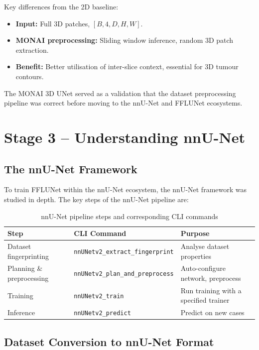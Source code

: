 \documentclass[12pt,a4paper]{report}
\begin{document}
Key differences from the 2D baseline:
\begin{itemize}[leftmargin=*]
    \item \textbf{Input:} Full 3D patches, $[B, 4, D, H, W]$.
    \item \textbf{MONAI preprocessing:} Sliding window inference, random 3D patch extraction.
    \item \textbf{Benefit:} Better utilisation of inter-slice context, essential for 3D tumour contours.
\end{itemize}

The MONAI 3D UNet served as a validation that the dataset preprocessing pipeline was correct before moving to the nnU-Net and FFLUNet ecosystems.

\section{Stage 3 -- Understanding nnU-Net}

\subsection{The nnU-Net Framework}

To train FFLUNet within the nnU-Net ecosystem, the nnU-Net framework was studied in depth. The key steps of the nnU-Net pipeline are:

\begin{table}[H]
\centering
\caption{nnU-Net pipeline steps and corresponding CLI commands}
\label{tab:nnunet_pipeline}
\begin{tabular}{lll}
\toprule
\textbf{Step} & \textbf{CLI Command} & \textbf{Purpose} \\
\midrule
Dataset fingerprinting & \texttt{nnUNetv2\_extract\_fingerprint} & Analyse dataset properties \\
Planning \& preprocessing & \texttt{nnUNetv2\_plan\_and\_preprocess} & Auto-configure network, preprocess \\
Training & \texttt{nnUNetv2\_train} & Run training with a specified trainer \\
Inference & \texttt{nnUNetv2\_predict} & Predict on new cases \\
\bottomrule
\end{tabular}
\end{table}

\subsection{Dataset Conversion to nnU-Net Format}
\end{document}
